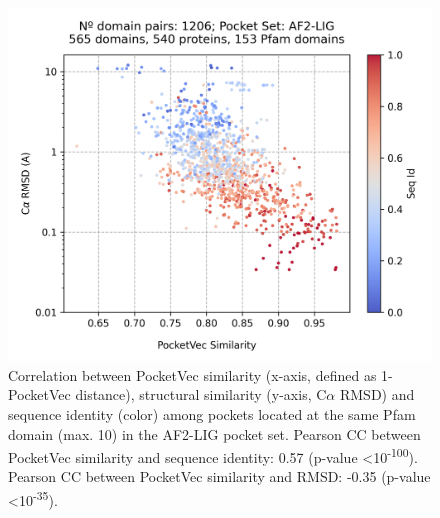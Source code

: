 \begin{figure}[htbp]
  \centering
  \includegraphics[width=0.6\linewidth]{figures/PocketVec/Supplementary/FigS27.png}
  \caption{
  Correlation between PocketVec similarity (x-axis, defined as 1-PocketVec distance), structural similarity (y-axis, C$\alpha$ RMSD) and sequence identity (color) among pockets located at the same Pfam domain (max. 10) in the AF2-LIG pocket set. Pearson CC between PocketVec similarity and sequence identity: 0.57 (p-value <10\textsuperscript{-100}). Pearson CC between PocketVec similarity and RMSD: -0.35 (p-value <10\textsuperscript{-35}). 
  }
  \label{PocketVec_FigS27}
\end{figure}



